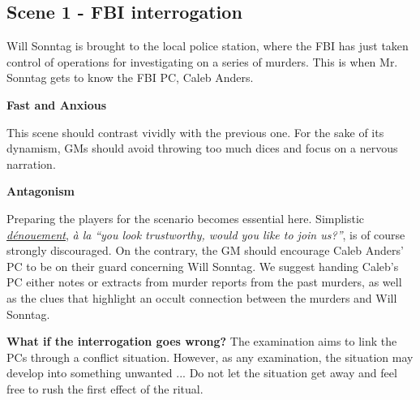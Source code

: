 \subsection{Scene 1 - FBI interrogation}

\begin{scene_summary}
Will Sonntag is brought to the local police station, where the FBI has just
taken control of operations for investigating on a series of murders. This is
when Mr. Sonntag gets to know the FBI PC, Caleb Anders.
\end{scene_summary}

\begin{leading_idea}
{\bf Fast and Anxious}

This scene should contrast vividly with the previous one. For the sake of its
dynamism, GMs should avoid throwing too much dices and focus on a nervous
narration.

{\bf Antagonism}

Preparing the players for the scenario becomes essential here. Simplistic
\href{http://deadgentlemen.com/projects/the-gamers/the-gamers/}{\textit{d\'enouement}},
\textit{\`a la} \textit{``you look trustworthy, would you like to join us?''},
is of course strongly discouraged. On the contrary, the GM should encourage
Caleb Anders' PC to be on their guard concerning Will Sonntag.  We suggest
handing Caleb's PC either notes or extracts from murder reports from the past
murders, as well as the clues that highlight an occult connection between the
murders and Will Sonntag.
\end{leading_idea}

\begin{sidenote}
{\bf What if the interrogation goes wrong?}
The examination aims to link the PCs through a conflict situation. However, as
any examination, the situation may develop into something unwanted ... Do not
let the situation get away and feel free to rush the first effect of
the ritual.
\end{sidenote}


